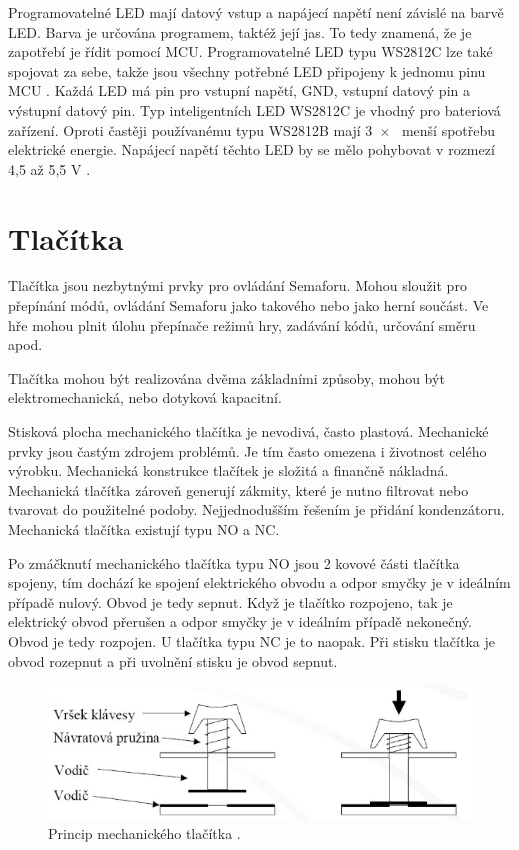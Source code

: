 Programovatelné LED mají datový vstup a napájecí napětí není závislé na barvě LED. 
Barva je určována programem, taktéž její jas. To tedy znamená, že je zapotřebí je řídit 
pomocí MCU. Programovatelné LED typu WS2812C lze také spojovat za sebe, takže jsou všechny potřebné LED připojeny k jednomu pinu 
MCU \cite{WS2812C_dtsh}. Každá LED má pin pro vstupní napětí, GND, vstupní datový pin a výstupní datový pin. Typ inteligentních LED 
WS2812C je vhodný pro bateriová zařízení. Oproti častěji používanému typu WS2812B mají 3~$\times$~ menší spotřebu elektrické energie. 
Napájecí napětí těchto LED by se mělo pohybovat v rozmezí 4,5 až 5,5 V \cite{WS2812C_dtsh}. 

\section{Tlačítka}
Tlačítka jsou nezbytnými prvky pro ovládání Semaforu. Mohou sloužit pro přepínání módů, ovládání Semaforu jako takového nebo jako herní 
součást. Ve hře mohou plnit úlohu přepínače režimů hry, zadávání kódů, určování směru apod. 

Tlačítka mohou být realizována dvěma základními způsoby, mohou být elektromechanická, nebo dotyková kapacitní. 

Stisková plocha mechanického tlačítka je nevodivá, často plastová. Mechanické prvky jsou častým zdrojem problémů. Je tím často omezena i 
životnost celého výrobku. Mechanická konstrukce tlačítek je složitá a finančně nákladná. Mechanická tlačítka zároveň generují zákmity, které 
je nutno filtrovat nebo tvarovat do použitelné podoby. Nejjednodušším řešením je přidání kondenzátoru. Mechanická tlačítka existují typu NO 
a NC. 

Po zmáčknutí mechanického tlačítka typu NO jsou 2 kovové části tlačítka spojeny, tím dochází ke spojení elektrického obvodu 
a odpor smyčky je v ideálním případě nulový. Obvod je tedy sepnut. Když je tlačítko rozpojeno, tak je 
elektrický obvod přerušen a odpor smyčky je v ideálním případě nekonečný. Obvod je tedy rozpojen. U tlačítka typu NC je to naopak. Při stisku 
tlačítka je obvod rozepnut a při uvolnění stisku je obvod sepnut. 

\begin{figure}[!h]
  \begin{center}
    \includegraphics[scale=0.6]{obrazky/tlacitka_princip.png}
  \end{center}
  \caption[Princip mechanického tlačítka]{Princip mechanického tlačítka \cite{Mech_tl_princip}.}
\end{figure}

